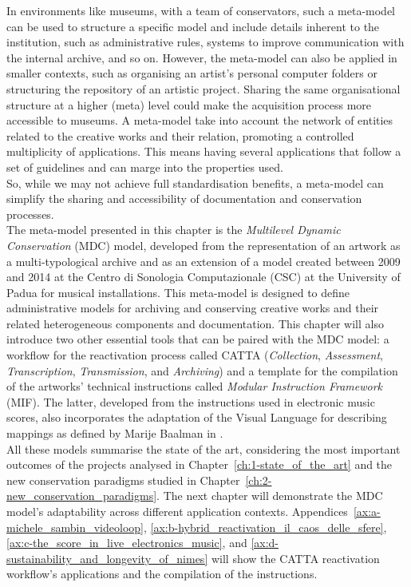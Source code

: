 In environments like museums, with a team of conservators, such a meta-model can be used to structure a specific model and include details inherent to the institution, such as administrative rules, systems to improve communication with the internal archive, and so on. However, the meta-model can also be applied in smaller contexts, such as organising an artist’s personal computer folders or structuring the repository of an artistic project. Sharing the same organisational structure at a higher (meta) level could make the acquisition process more accessible to museums. A meta-model take into account the network of entities related to the creative works and their relation, promoting a controlled multiplicity of applications. This means having several applications that follow a set of guidelines and can marge into the properties used.\\
So, while we may not achieve full standardisation benefits, a meta-model can simplify the sharing and accessibility of documentation and conservation processes.\\
The meta-model presented in this chapter is the \textit{Multilevel Dynamic Conservation} (MDC) model, developed from the representation of an artwork as a multi-typological archive and as an extension of a model created between 2009 and 2014 at the Centro di Sonologia Computazionale (CSC) at the University of Padua for musical installations. This meta-model is designed to define administrative models for archiving and conserving creative works and their related heterogeneous components and documentation. This chapter will also introduce two other essential tools that can be paired with the MDC model: a workflow for the reactivation process called CATTA (\textit{Collection}, \textit{Assessment}, \textit{Transcription}, \textit{Transmission}, and \textit{Archiving}) and a template for the compilation of the artworks' technical instructions called \textit{Modular Instruction Framework} (MIF). The latter, developed from the instructions used in electronic music scores, also incorporates the adaptation of the Visual Language for describing mappings as defined by Marije Baalman in \cite{baalman2022composing}.\\
All these models summarise the state of the art, considering the most important outcomes of the projects analysed in Chapter~\ref{ch:1-state_of_the_art} and the new conservation paradigms studied in Chapter~\ref{ch:2-new_conservation_paradigms}. The next chapter will demonstrate the MDC model's adaptability across different application contexts. Appendices~\ref{ax:a-michele_sambin_videoloop}, \ref{ax:b-hybrid_reactivation_il_caos_delle_sfere}, \ref{ax:c-the_score_in_live_electronics_music}, and \ref{ax:d-sustainability_and_longevity_of_nimes} will show the CATTA reactivation workflow's applications and the compilation of the instructions.

